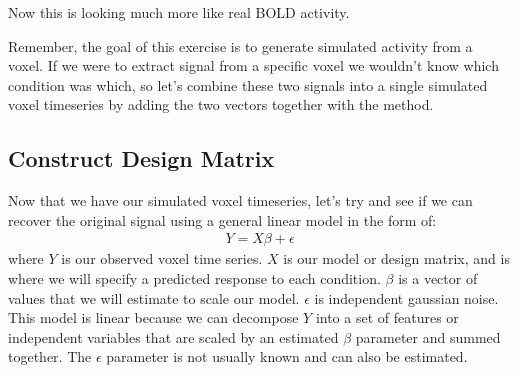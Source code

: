 \documentclass[letterpaper,10pt,english]{sphinxmanual}
\begin{document}
\begin{sphinxVerbatim}[commandchars=\\\{\}]
  
   
    

 \PYG{p}{[} \PYG{p}{]}
\end{sphinxVerbatim}

\noindent{}

Now this is looking much more like real BOLD activity.

Remember, the goal of this exercise is to generate simulated activity from a voxel. If we were to extract signal from a specific voxel we wouldn’t know which condition was which, so let’s combine these two signals into a single simulated voxel timeseries by adding the two vectors together with the  method.

\begin{sphinxVerbatim}[commandchars=\\\{\}]
  

\end{sphinxVerbatim}

\noindent{}


\subsection{Construct Design Matrix}
\label{\detokenize{content/GLM:construct-design-matrix}}
Now that we have our simulated voxel timeseries, let’s try and see if we can recover the original signal using a general linear model in the form of:
\begin{equation*}
\begin{split}Y = X\beta + \epsilon\end{split}
\end{equation*}
where \(Y\) is our observed voxel time series. \(X\) is our model or design matrix, and is where we will specify a predicted response to each condition. \(\beta\) is a vector of values that we will estimate to scale our model. \(\epsilon\) is independent gaussian noise. This model is linear because we can decompose \(Y\) into a set of features or independent variables that are scaled by an estimated \(\beta\) parameter and summed together. The \(\epsilon\) parameter is not usually known and can also be estimated.
\end{document}
